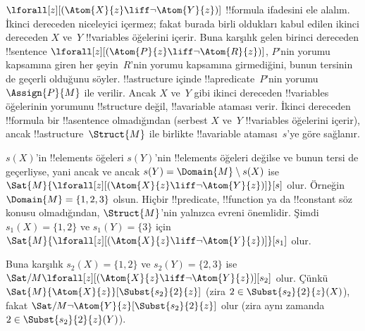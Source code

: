 \begin{ex}
  $\lforall[z][(\Atom{X}{z} \liff \lnot \Atom{Y}{z})]$ !!{formula}
  ifadesini ele alalım. İkinci dereceden niceleyici içermez; fakat burada
  birli oldukları kabul edilen ikinci dereceden $X$ ve~$Y$ !!{variable}s
  öğelerini içerir. Buna karşılık gelen birinci dereceden !!{sentence}
  $\lforall[z][(\Atom{P}{z} \liff \lnot \Atom{R}{z})]$, $P$'nin yorumu
  kapsamına giren her şeyin~$R$'nin yorumu kapsamına girmediğini, bunun
  tersinin de geçerli olduğunu söyler. !!a{structure} içinde
  !!a{predicate}~$P$'nin yorumu~$\Assign{P}{M}$ ile verilir. Ancak $X$
  ve~$Y$ gibi ikinci dereceden !!{variable}s öğelerinin yorumunu
  !!{structure} değil, !!a{variable} ataması verir. İkinci dereceden
  !!{formula} bir !!a{sentence} olmadığından (serbest $X$ ve~$Y$
  !!{variable}s öğelerini içerir), ancak !!a{structure}~$\Struct{M}$ ile
  birlikte !!a{variable} ataması~$s$'ye göre sağlanır.

  $s(X)$'in !!{element}s öğeleri $s(Y)$'nin !!{element}s öğeleri değilse
  ve bunun tersi de geçerliyse, yani ancak ve ancak
  $s(Y) = \Domain{M} \setminus s(X)$ ise
  $\Sat{M}{\lforall[z][(\Atom{X}{z} \liff \lnot \Atom{Y}{z})]}[s]$ olur.
  Örneğin $\Domain{M} = \{1, 2, 3\}$ olsun. Hiçbir !!{predicate},
  !!{function} ya da !!{constant} söz konusu olmadığından,
  $\Struct{M}$'nin yalnızca evreni önemlidir. Şimdi
  $s_1(X) = \{1, 2\}$ ve $s_1(Y) = \{3\}$ için
  $\Sat{M}{\lforall[z][(\Atom{X}{z}
      \liff \lnot \Atom{Y}{z})]}[s_1]$ olur.

  Buna karşılık $s_2(X) = \{1, 2\}$ ve $s_2(Y) = \{2, 3\}$ ise
  $\Sat/{M}{\lforall[z][(\Atom{X}{z} \liff \lnot
      \Atom{Y}{z})]}[s_2]$ olur. Çünkü
  $\Sat{M}{\Atom{X}{z}}[\Subst{s_2}{2}{z}]$ (zira
  $2 \in \Subst{s_2}{2}{z}(X)$), fakat
  $\Sat/{M}{\lnot \Atom{Y}{z}}[\Subst{s_2}{2}{z}]$ olur (zira aynı zamanda
  $2 \in \Subst{s_2}{2}{z}(Y)$).
\end{ex}

